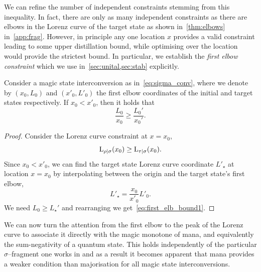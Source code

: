 \documentclass[pra,
aps,
twocolumn,
superscriptaddress,
groupedaddress,
nofootinbib,
reprint
]{revtex4-1}
\begin{document}
We can refine the number of independent constraints stemming from this inequality. 
In fact, there are only as many independent constraints as there are elbows in the Lorenz curve of the target state as shown in~\cref{thm:elbows} in~\cref{app:frag}.
However, in principle any one location $x$ provides a valid constraint leading to some upper distillation bound, while optimising over the location would provide the strictest bound.
In particular, we establish the \emph{first elbow constraint} which we use in~\cref{sec:unital,sec:stab} explicitly.
\begin{lemma}
	Consider a magic state interconversion as in~\cref{eq:sigma_conv}, where we denote by $(x_0, L_0)$ and $(x'_0, L'_0)$ the first elbow coordinates of the initial and target states respectively.
	If $x_0 < x'_0$, then it holds that
\begin{equation}\label{eq:first_elb_bound1}
	\frac{L_0}{x_0} \geq \frac{L_0'}{x_0'}.
\end{equation}
\end{lemma}
\begin{proof}
	Consider the Lorenz curve constraint at $x = x_0$,
\begin{equation}
	{{\rm{L}}_{\rho|\sigma}}(x_0) \geq {{\rm{L}}_{\tau|\sigma}}(x_0).
\end{equation}
Since $x_0 < x'_0$, we can find the target state Lorenz curve coordinate $L'_\star$ at location $x = x_0$ by interpolating between the origin and the target state's first elbow, 
\begin{equation}
	L'_\star = \frac{x_0}{x'_0}L'_0.
\end{equation}
We need $L_0 \geq L_\star'$ and rearranging we get~\cref{eq:first_elb_bound1}.
\end{proof}

We can now turn the attention from the first elbow to the peak of the Lorenz curve to associate it directly with the magic monotone of mana, and equivalently the sum-negativity of a quantum state. 
This holds independently of the particular $\sigma$--fragment one works in and as a result it becomes apparent that mana provides a weaker condition than majorisation for all magic state interconversions.
\end{document}
